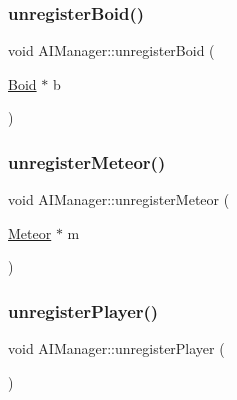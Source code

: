 \hypertarget{class_a_i_manager_accc5ec3be7c8df6f72aa519e47454a6d}{}\label{class_a_i_manager_accc5ec3be7c8df6f72aa519e47454a6d} 
\subsubsection{\texorpdfstring{unregister\+Boid()}{unregisterBoid()}}
{\footnotesize\ttfamily void A\+I\+Manager\+::unregister\+Boid (\begin{DoxyParamCaption}\item[{\hyperlink{class_boid}{Boid} $\ast$}]{b }\end{DoxyParamCaption})\hspace{0.3cm}{\ttfamily [static]}}

\hypertarget{class_a_i_manager_ae95e3ce383599bba475efd56c1659e8c}{}\label{class_a_i_manager_ae95e3ce383599bba475efd56c1659e8c} 
\subsubsection{\texorpdfstring{unregister\+Meteor()}{unregisterMeteor()}}
{\footnotesize\ttfamily void A\+I\+Manager\+::unregister\+Meteor (\begin{DoxyParamCaption}\item[{\hyperlink{class_meteor}{Meteor} $\ast$}]{m }\end{DoxyParamCaption})\hspace{0.3cm}{\ttfamily [static]}}

\hypertarget{class_a_i_manager_a372acb15818c45e4f84848103d5afecf}{}\label{class_a_i_manager_a372acb15818c45e4f84848103d5afecf} 
\subsubsection{\texorpdfstring{unregister\+Player()}{unregisterPlayer()}}
{\footnotesize\ttfamily void A\+I\+Manager\+::unregister\+Player (\begin{DoxyParamCaption}{ }\end{DoxyParamCaption})\hspace{0.3cm}{\ttfamily [static]}}

